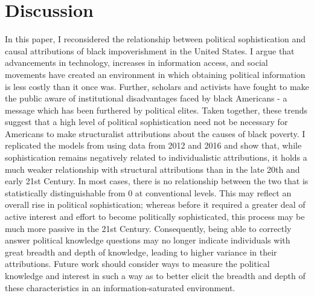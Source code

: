 \documentclass[12pt]{paper}
\begin{document}
\section{Discussion}
In this paper, I reconsidered the relationship between political sophistication and causal attributions of black impoverishment in the United States. I argue that advancements in technology, increases in information access, and social movements have created an environment in which obtaining political information is less costly than it once was. Further, scholars and activists have fought to make the public aware of institutional disadvantages faced by black Americans - a message which has been furthered by political elites. Taken together, these trends suggest that a high level of political sophistication need not be necessary for Americans to make structuralist attributions about the causes of black poverty. I replicated the models from \cite{gomez_rethinking_2006} using data from 2012 and 2016 and show that, while sophistication remains negatively related to individualistic attributions, it holds a much weaker relationship with structural attributions than in the late 20th and early 21st Century. In most cases, there is no relationship between the two that is statistically distinguishable from 0 at conventional levels. This may reflect an overall rise in political sophistication; whereas before it required a greater deal of active interest and effort to become politically sophisticated, this process may be much more passive in the 21st Century. Consequently, being able to correctly answer political knowledge questions may no longer indicate individuals with great breadth and depth of knowledge, leading to higher variance in their attributions. Future work should consider ways to measure the political knowledge and interest in such a way as to better elicit the breadth and depth of these characteristics in an information-saturated environment.


\pagebreak
\singlespacing

\end{document}
